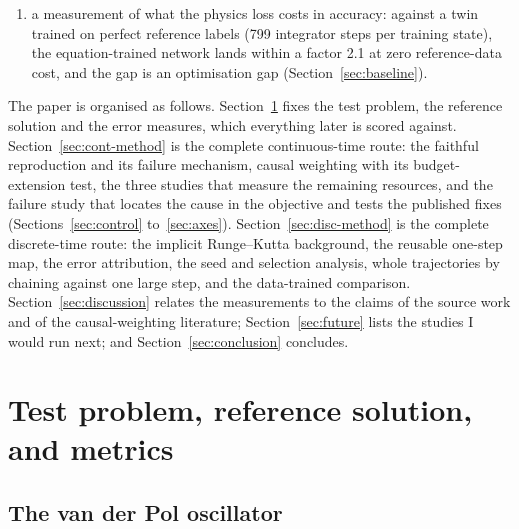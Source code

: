 \documentclass[11pt,a4paper]{article}
\begin{document}
\begin{enumerate}
  map, chained without retraining, completes six periods at
  $2.0\times10^{-3}$ relative error where the causally weighted
  continuous-time formulation has an error above one, and beats the
  alternative reading of the source work in which one network learns a
  single large step covering the whole horizon by a factor 10 at the
  largest feasible step, which is bounded by nonlinear solvability rather
  than stability (Section~\ref{sec:disc-routes}); and
  \item a measurement of what the physics loss costs in accuracy: against
  a twin trained on perfect reference labels (799 integrator steps per
  training state), the equation-trained network lands within a factor 2.1
  at zero reference-data cost, and the gap is an optimisation gap
  (Section~\ref{sec:baseline}).
\end{enumerate}

The paper is organised as follows. Section~\ref{sec:problem} fixes the
test problem, the reference solution and the error measures, which
everything later is scored against. Section~\ref{sec:cont-method} is the
complete continuous-time route: the faithful reproduction and its failure
mechanism, causal weighting with its budget-extension test, the three studies that measure the remaining resources, and the failure study that locates the cause in the objective and tests the published fixes (Sections~\ref{sec:control} to~\ref{sec:axes}).
Section~\ref{sec:disc-method} is the complete discrete-time route: the
implicit Runge--Kutta background, the reusable one-step map, the error
attribution, the seed and selection analysis, whole trajectories by
chaining against one large step, and the data-trained comparison.
Section~\ref{sec:discussion} relates the measurements to the claims of the
source work and of the causal-weighting literature;
Section~\ref{sec:future} lists the studies I would run next; and
Section~\ref{sec:conclusion} concludes.

\section{Test problem, reference solution, and metrics}
\label{sec:problem}

\subsection{The van der Pol oscillator}
\end{document}
